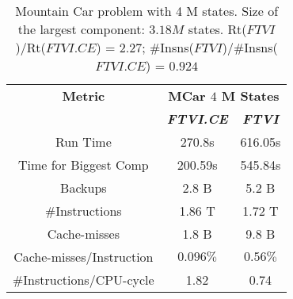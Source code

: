 \documentclass[conference]{IEEEtran}
\begin{document}
\begin{table}[h!]
\caption{Mountain Car problem with 4 M states. Size of the largest component: $3.18 M$ states. Rt($FTVI$)/Rt($FTVI.CE$) = $2.27$; \#Insns($FTVI$)/\#Insns($FTVI.CE$) = $0.924$}
\begin{center}
\begin{tabular}{|c|c|c|}
\hline
\textbf{Metric}&\multicolumn{2}{|c|}{\textbf{MCar $4$ M States}} \\
\cline{2-3} 
\textbf{} & \textbf{\textit{FTVI.CE}} & \textbf{\textit{FTVI}} \\
\hline
Run Time & 270.8s & 616.05s \\
\hline
Time for Biggest Comp & 200.59s & 545.84s \\
\hline
Backups & 2.8 B & 5.2 B \\
\hline
\#Instructions & 1.86 T & 1.72 T \\
\hline
Cache-misses &1.8 B & 9.8 B \\
\hline 
Cache-misses/Instruction & $0.096\%$ & $0.56\%$ \\
\hline
\#Instructions/CPU-cycle & 1.82 & 0.74 \\
\hline
\end{tabular}
\label{tab2}
\end{center}
\end{table}
\end{document}

